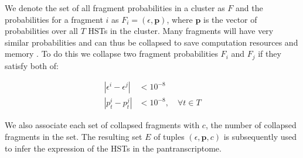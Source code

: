 \documentclass[11pt]{ucthesis}
\begin{document}
	
We denote the set of all fragment probabilities in a cluster as $F$ and the probabilities for a fragment $i$ as ${F_i=\left(\epsilon,\textbf{p}\right)}$, where $\textbf{p}$ is the vector of probabilities over all $T$ HSTs in the cluster. Many fragments will have very similar probabilities and can thus be collapsed to save computation resources and memory \cite{nicolae2011estimation,patro2017salmon}. To do this we collapse two fragment probabilities $F_i$ and $F_j$ if they satisfy both of:


\begin{align}
    \left|\epsilon^{i}-\epsilon^{j}\right| &< 10^{-8} \\	\left|p_t^{i}-p_t^{j}\right| &< 10^{-8},\quad\forall t\in T
\end{align}

We also associate each set of collapsed fragments with $c$, the number of collapsed fragments in the set. The resulting set $E$ of tuples ${\left(\epsilon, \textbf{p}, c\right)}$ is subsequently used to infer the expression of the HSTs in the pantranscriptome.

\end{document}
